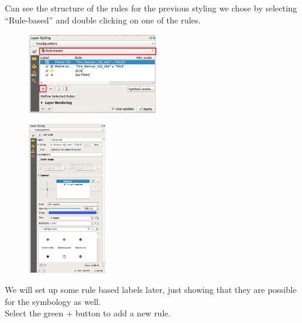 Can see the structure of the rules for the previous styling we chose by selecting “Rule-based” and double clicking on one of the rules.

\begin{figure}[!h]
	\centering
	\includegraphics[width=0.5\textwidth]{images/headquarter_rule_based_styles1.png}
	\caption{}
	\label{ft_fig_firstfig3}
\end{figure}


\begin{figure}[!h]
	\centering
	\includegraphics[width=0.3\textwidth]{images/headquarter_rule_based_styles2.png}
	\caption{}
	\label{ft_fig_firstfig3}
\end{figure}

We will set up some rule based labels later, just showing that they are possible for the symbology as well.\\

Select the green + button to add a new rule.\\

\null\newpage


